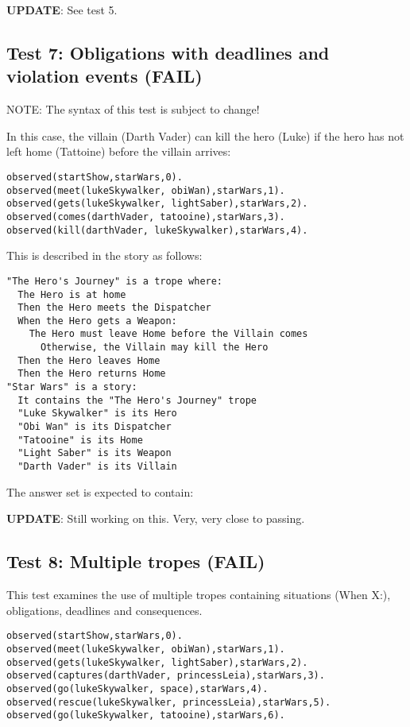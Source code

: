 \documentclass[11pt]{article}
\begin{document}
\textbf{UPDATE}: See test 5.

\subsection{Test 7: Obligations with deadlines and violation events (FAIL)}
\label{sec:orgheadline7}

NOTE: The syntax of this test is subject to change!

In this case, the villain (Darth Vader) can kill the hero (Luke) if the hero has not left home (Tattoine) before the villain arrives:

\begin{verbatim}
observed(startShow,starWars,0).
observed(meet(lukeSkywalker, obiWan),starWars,1).
observed(gets(lukeSkywalker, lightSaber),starWars,2).
observed(comes(darthVader, tatooine),starWars,3).
observed(kill(darthVader, lukeSkywalker),starWars,4).
\end{verbatim}

This is described in the story as follows:

\begin{verbatim}
"The Hero's Journey" is a trope where:
  The Hero is at home
  Then the Hero meets the Dispatcher
  When the Hero gets a Weapon:
    The Hero must leave Home before the Villain comes
      Otherwise, the Villain may kill the Hero
  Then the Hero leaves Home
  Then the Hero returns Home
"Star Wars" is a story:
  It contains the "The Hero's Journey" trope
  "Luke Skywalker" is its Hero
  "Obi Wan" is its Dispatcher
  "Tatooine" is its Home
  "Light Saber" is its Weapon
  "Darth Vader" is its Villain
\end{verbatim}

The answer set is expected to contain:

\textbf{UPDATE}: Still working on this. Very, very close to passing.

\subsection{Test 8: Multiple tropes (FAIL)}
\label{sec:orgheadline8}

This test examines the use of multiple tropes containing situations (When X:), obligations, deadlines and consequences.

\begin{verbatim}
observed(startShow,starWars,0).
observed(meet(lukeSkywalker, obiWan),starWars,1).
observed(gets(lukeSkywalker, lightSaber),starWars,2).
observed(captures(darthVader, princessLeia),starWars,3).
observed(go(lukeSkywalker, space),starWars,4).
observed(rescue(lukeSkywalker, princessLeia),starWars,5).
observed(go(lukeSkywalker, tatooine),starWars,6).
\end{verbatim}
\end{document}
